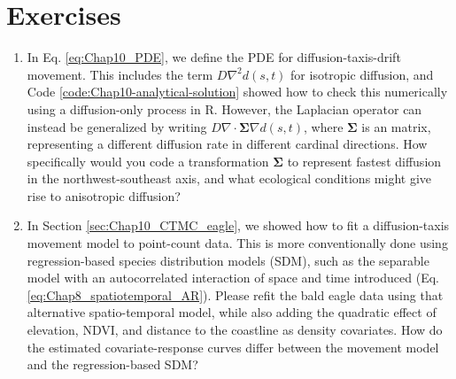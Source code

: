 \section{Exercises}

\begin{enumerate}
    \item In Eq. \ref{eq:Chap10_PDE}, we define the PDE for diffusion-taxis-drift movement. This includes the term \(D \nabla^2 d(s,t)\) for isotropic diffusion, and Code \ref{code:Chap10-analytical-solution} showed how to check this numerically using a diffusion-only process in R. However, the Laplacian operator can instead be generalized by writing \(D \nabla \cdot \mathbf{\Sigma} \nabla d(s,t)\), where \(\mathbf{\Sigma}\) is an  matrix, representing a different diffusion rate in different cardinal directions.  How specifically would you code a transformation \(\mathbf{\Sigma}\) to represent fastest diffusion in the northwest-southeast axis, and what ecological conditions might give rise to anisotropic diffusion?
    
    \item In Section \ref{sec:Chap10_CTMC_eagle}, we showed how to fit a diffusion-taxis movement model to point-count data.  This is more conventionally done using regression-based species distribution models (SDM), such as the separable model with an autocorrelated interaction of space and time introduced (Eq. \ref{eq:Chap8_spatiotemporal_AR}).  Please refit the bald eagle data using that alternative spatio-temporal model, while also adding the quadratic effect of elevation, NDVI, and distance to the coastline as density covariates.  How do the estimated covariate-response curves differ between the movement model and the regression-based SDM?   
\end{enumerate}

